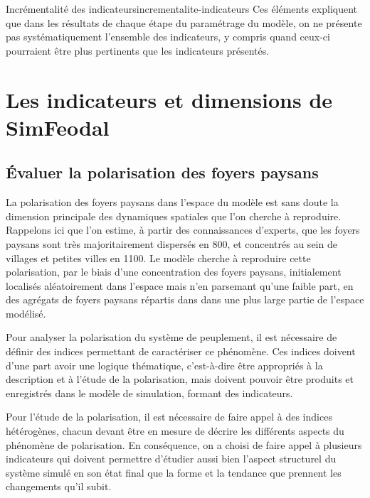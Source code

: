 \begin{encadre}{Incrémentalité des indicateurs}{incrementalite-indicateurs}
Ces éléments expliquent que dans les résultats de chaque étape du paramétrage du modèle, on ne présente pas systématiquement l'ensemble des indicateurs, y compris quand ceux-ci pourraient être plus pertinents que les indicateurs présentés.
\end{encadre}


\pagebreak

\section{Les indicateurs et dimensions de SimFeodal}

\subsection{Évaluer la polarisation des foyers paysans \label{subsub:polarisation}}

La polarisation des foyers paysans dans l'espace du modèle est sans doute la dimension principale des dynamiques spatiales que l'on cherche à reproduire.
Rappelons ici que l'on estime, à partir des connaissances d'experts, que les foyers paysans sont très majoritairement dispersés en 800, et concentrés au sein de villages et petites villes en 1100.
Le modèle cherche à reproduire cette polarisation, par le biais d'une concentration des foyers paysans, initialement localisés aléatoirement dans l'espace mais n'en parsemant qu'une faible part, en des agrégats de foyers paysans répartis dans dans une plus large partie de l'espace modélisé.

Pour analyser la polarisation du système de peuplement, il est nécessaire de définir des indices permettant de caractériser ce phénomène.
Ces indices doivent d'une part avoir une logique thématique, c'est-à-dire être appropriés à la description et à l'étude de la polarisation, mais doivent  pouvoir être produits et enregistrés dans le modèle de simulation, formant des indicateurs.

Pour l'étude de la polarisation, il est nécessaire de faire appel à des indices hétérogènes, chacun devant être en mesure de décrire les différents aspects du phénomène de polarisation.
En conséquence, on a choisi de faire appel à plusieurs indicateurs qui doivent permettre d'étudier aussi bien l'aspect structurel du système simulé en son état final que la forme et la tendance que prennent les changements qu'il subit.

